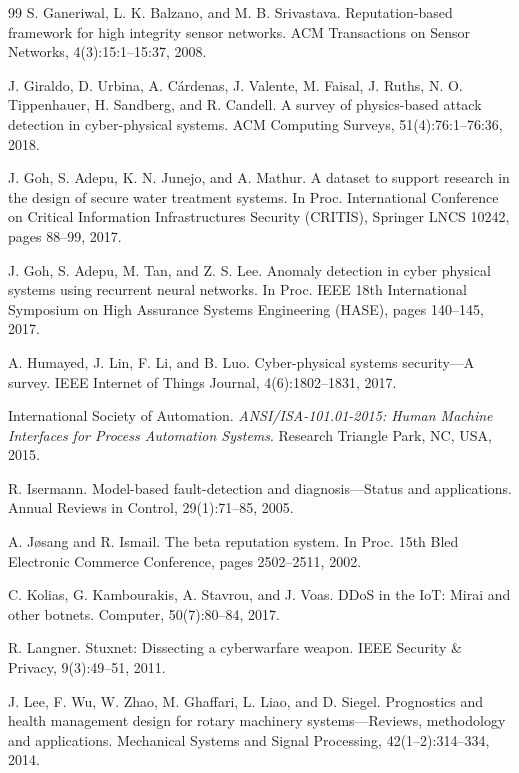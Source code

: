 \begin{thebibliography}{99}
 S. Ganeriwal, L. K. Balzano, and M. B. Srivastava. Reputation-based framework for high integrity sensor networks. ACM Transactions on Sensor Networks, 4(3):15:1--15:37, 2008.

 J. Giraldo, D. Urbina, A. C\'ardenas, J. Valente, M. Faisal, J. Ruths, N. O. Tippenhauer, H. Sandberg, and R. Candell. A survey of physics-based attack detection in cyber-physical systems. ACM Computing Surveys, 51(4):76:1--76:36, 2018.

 J. Goh, S. Adepu, K. N. Junejo, and A. Mathur. A dataset to support research in the design of secure water treatment systems. In Proc. International Conference on Critical Information Infrastructures Security (CRITIS), Springer LNCS 10242, pages 88--99, 2017.

 J. Goh, S. Adepu, M. Tan, and Z. S. Lee. Anomaly detection in cyber physical systems using recurrent neural networks. In Proc. IEEE 18th International Symposium on High Assurance Systems Engineering (HASE), pages 140--145, 2017.

 A. Humayed, J. Lin, F. Li, and B. Luo. Cyber-physical systems security---A survey. IEEE Internet of Things Journal, 4(6):1802--1831, 2017.

 International Society of Automation. \emph{ANSI/ISA-101.01-2015: Human Machine Interfaces for Process Automation Systems}. Research Triangle Park, NC, USA, 2015.

 R. Isermann. Model-based fault-detection and diagnosis---Status and applications. Annual Reviews in Control, 29(1):71--85, 2005.

 A. J{\o}sang and R. Ismail. The beta reputation system. In Proc. 15th Bled Electronic Commerce Conference, pages 2502--2511, 2002.

 C. Kolias, G. Kambourakis, A. Stavrou, and J. Voas. DDoS in the IoT: Mirai and other botnets. Computer, 50(7):80--84, 2017.

 R. Langner. Stuxnet: Dissecting a cyberwarfare weapon. IEEE Security \& Privacy, 9(3):49--51, 2011.

 J. Lee, F. Wu, W. Zhao, M. Ghaffari, L. Liao, and D. Siegel. Prognostics and health management design for rotary machinery systems---Reviews, methodology and applications. Mechanical Systems and Signal Processing, 42(1--2):314--334, 2014.


\end{thebibliography}
